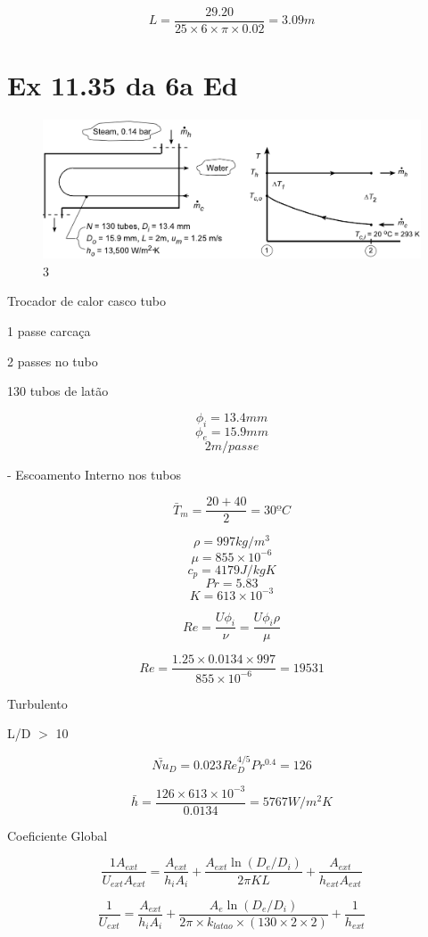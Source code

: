 \documentclass[a4paper, 12pt]{article}
\begin{document}
\[L = \frac{29.20}{25 \times 6 \times \pi \times 0.02} = 3.09 m\]

\section{Ex 11.35 da 6a Ed}

\begin{figure}[h]
\begin{center}
\includegraphics[scale=0.45]{./fig/5.png}
\caption{\label{fig:3}3} 
\end{center}
\end{figure}

Trocador de calor casco tubo

1 passe carcaça

2 passes no tubo

130 tubos de latão

\[\phi _{i} = 13.4mm\]
\[\phi _{e} = 15.9mm\]
\[2m/passe\]

- Escoamento Interno nos tubos

\[\bar{T}_{m}=\frac{20+40}{2}=30ºC\]

\[\rho = 997 kg/m^{3}\]
\[\mu = 855 \times 10^{-6}\]
\[c_{p} = 4179 J/kgK\]
\[Pr = 5.83\]
\[K = 613 \times 10^{-3}\]

\[Re = \frac{U \phi _{i}}{\nu} = \frac{U \phi _{i} \rho}{\mu}\]

\[Re = \frac{1.25 \times 0.0134 \times 997 } { 855 \times 10 ^{-6}} = 19531\]

Turbulento

L/D $>$ 10

\[\bar{Nu}_{D} = 0.023 Re_{D}^{4/5}Pr^{0.4}=126\]

\[\bar{h}=\frac{126 \times 613 \times 10^{-3}}{ 0.0134 } = 5767 W/m^{2}K\]

Coeficiente Global

\[\frac{1 A_{ext}}{U_{ext}A_{ext}}=\frac{A_{ext}}{h_{i}A_{i}}+\frac{A_{ext}\ln(D_{e}/D_{i})}{2 \pi KL}+\frac{A_{ext}}{h_{ext}A_{ext}}
\]

\[\frac{1}{U_{ext}}=\frac{A_{ext}}{h_{i}A_{i}}+\frac{A_{e}\ln(D_{e}/D_{i})}{2 \pi \times k_{latao} \times (130\times 2 \times 2)} + \frac{1}{h_{ext}}\]
\end{document}
